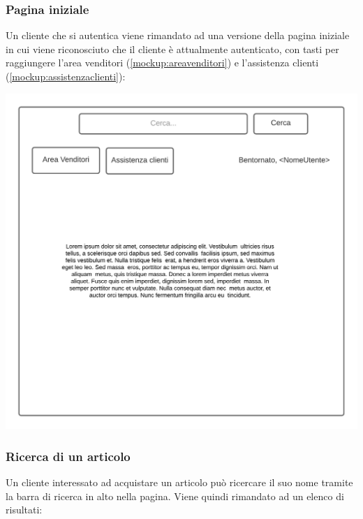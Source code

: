\documentclass[12pt]{article}
\begin{document}
\newpage

\subsubsection{Pagina iniziale}
\label{mockup:clienteauth}
Un cliente che si autentica viene rimandato ad una versione della pagina iniziale in cui viene riconosciuto che il cliente è attualmente autenticato, con tasti per raggiungere l'area venditori (\ref{mockup:areavenditori}) e l'assistenza clienti (\ref{mockup:assistenzaclienti}):

\begin{center}
\includegraphics[height=0.3\textheight]{Mockup/Cliente/PaginaInizialeAutenticato}
\end{center}

\subsubsection{Ricerca di un articolo}
\label{mockup:clientericerca}
Un cliente interessato ad acquistare un articolo può ricercare il suo nome tramite la barra di ricerca in alto nella pagina. Viene quindi rimandato ad un elenco di risultati:
\end{document}
